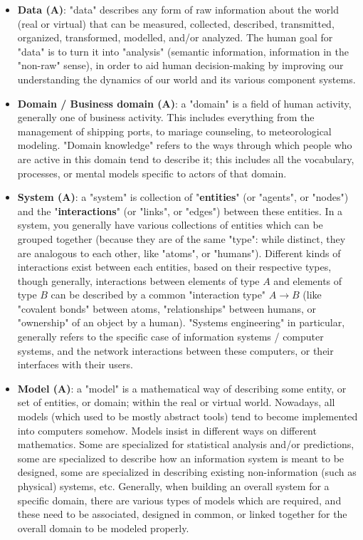 \documentclass{article}
\begin{document}
\begin{itemize}
	\item \textbf{Data (A)}: "data" describes any form of raw information about the world (real or virtual) that can be measured, collected, described, transmitted, organized, transformed, modelled, and/or analyzed. The human goal for "data" is to turn it into "analysis" (semantic information, information in the "non-raw" sense), in order to aid human decision-making by improving our understanding the dynamics of our world and its various component systems.

	\item \textbf{Domain / Business domain (A)}: a "domain" is a field of human activity, generally one of business activity. This includes everything from the management of shipping ports, to mariage counseling, to meteorological modeling. "Domain knowledge" refers to the ways through which people who are active in this domain tend to describe it; this includes all the vocabulary, processes, or mental models specific to actors of that domain.

	\item \textbf{System (A)}: a "system" is collection of "\textbf{entities}" (or "agents", or "nodes") and the "\textbf{interactions}" (or "links", or "edges") between these entities. In a system, you generally have various collections of entities which can be grouped together (because they are of the same "type": while distinct, they are analogous to each other, like "atoms", or "humans"). Different kinds of interactions exist between each entities, based on their respective types, though generally, interactions between elements of type $A$ and elements of type $B$ can be described by a common "interaction type" $A \to B$ (like "covalent bonds" between atoms, "relationships" between humans, or "ownership" of an object by a human). "Systems engineering" in particular, generally refers to the specific case of information systems / computer systems, and the network interactions between these computers, or their interfaces with their users.

	\item \textbf{Model (A)}: a "model" is a mathematical way of describing some entity, or set of entities, or domain; within the real or virtual world. Nowadays, all models (which used to be mostly abstract tools) tend to become implemented into computers somehow. Models insist in different ways on different mathematics. Some are specialized for statistical analysis and/or predictions, some are specialized to describe how an information system is meant to be designed, some are specialized in describing existing non-information (such as physical) systems, etc. Generally, when building an overall system for a specific domain, there are various types of models which are required, and these need to be associated, designed in common, or linked together for the overall domain to be modeled properly.


\end{itemize}
\end{document}
